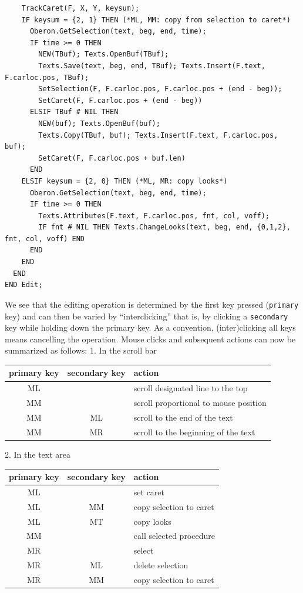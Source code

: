 \begin{verbatim}
    TrackCaret(F, X, Y, keysum);
    IF keysum = {2, 1} THEN (*ML, MM: copy from selection to caret*)
      Oberon.GetSelection(text, beg, end, time);
      IF time >= 0 THEN
        NEW(TBuf); Texts.OpenBuf(TBuf);
        Texts.Save(text, beg, end, TBuf); Texts.Insert(F.text, F.carloc.pos, TBuf);
        SetSelection(F, F.carloc.pos, F.carloc.pos + (end - beg));
        SetCaret(F, F.carloc.pos + (end - beg))
      ELSIF TBuf # NIL THEN
        NEW(buf); Texts.OpenBuf(buf);
        Texts.Copy(TBuf, buf); Texts.Insert(F.text, F.carloc.pos, buf);
        SetCaret(F, F.carloc.pos + buf.len)
      END
    ELSIF keysum = {2, 0} THEN (*ML, MR: copy looks*)
      Oberon.GetSelection(text, beg, end, time);
      IF time >= 0 THEN
        Texts.Attributes(F.text, F.carloc.pos, fnt, col, voff);
        IF fnt # NIL THEN Texts.ChangeLooks(text, beg, end, {0,1,2}, fnt, col, voff) END
      END
    END
  END
END Edit;
\end{verbatim}

We see that the editing operation is determined by the first key pressed (\verb|primary| key)
and can then be varied by “interclicking” that is, by clicking a \verb|secondary| key
while holding down the primary key.
As a convention, (inter)clicking all keys means cancelling the operation. Mouse clicks and
subsequent actions can now be summarized as follows:
1. In the scroll bar
\begin{table}[h!]
  \centering
  \begin{tabular}{c c l}
    primary key & secondary key & action \\\hline
        ML      &               & scroll designated line to the top \\
        MM      &               & scroll proportional to mouse position \\
        MM      &      ML       & scroll to the end of the text \\
        MM      &      MR       & scroll to the beginning of the text
  \end{tabular}
\end{table}

2. In the text area
\begin{table}[h!]
  \centering
  \begin{tabular}{c c l}
    primary key & secondary key & action \\\hline
        ML      &               & set caret \\
        ML      &       MM      & copy selection to caret \\
        ML      &       MT      & copy looks \\
        MM      &               & call selected procedure \\
        MR      &               & select \\
        MR      &       ML      & delete selection \\
        MR      &       MM      & copy selection to caret
  \end{tabular}
\end{table}

